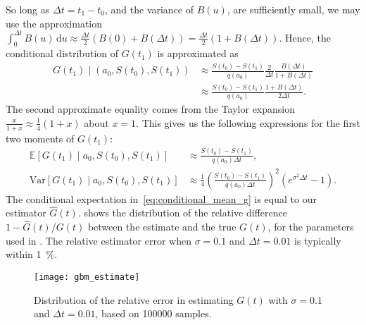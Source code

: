 \documentclass[main.tex]{subfiles}
\begin{document}
So long as $\Delta t=t_1-t_0$, and the variance of $B(u)$, are
sufficiently small, we may use the approximation
$\int_{0}^{\Delta{t}}B(u)\,\mathrm{d}u\approx  \frac{\Delta
  t}{2}(B(0)+B(\Delta t))=\frac{\Delta
  t}{2}(1+B(\Delta t))$.
Hence, the conditional distribution of $G(t_1)$ is approximated as
\begin{align}
  G(t_1)\mid (a_0,S(t_0),S(t_1))
  &\approx
    \frac{S(t_0)-S(t_1)}{q(a_0)}\frac{2}{\Delta t}\frac{B(\Delta t)}{1+B(\Delta t)}\\
  &\approx \frac{S(t_0)-S(t_1)}{q(a_0)}\frac{1+B(\Delta t)}{2\Delta t}.
\end{align}
The second approximate equality comes from the Taylor
expansion $\frac{x}{1+x}\approx \frac{1}{4}(1+x)$ about $x=1$.
This gives us the following expressions for the first two moments
of $G(t_1)$:
\begin{align}\label{eq:conditional_mean_g}
  \mathbb{E}[G(t_1)\mid a_0,S(t_0),S(t_1)]
  &\approx \frac{S(t_0)-S(t_1)}{ q(a_0)\Delta t},\\
  \mbox{Var}[G(t_1)\mid a_0,S(t_0),S(t_1)]
  &\approx \frac{1}{4}{\left(\frac{S(t_0)-S(t_1)}{
    q(a_0)\Delta t}\right)}^2\left( e^{\sigma^2\Delta t} -1 \right).
\end{align}
The conditional expectation in~\eqref{eq:conditional_mean_g} is equal
to our estimator $\hat G(t)$.
 shows the distribution of the relative
difference $1-\hat G(t)/G(t)$ between
the estimate and the true $G(t)$, for
the parameters used in . The relative
estimator error when $\sigma=0.1$ and $\Delta t=0.01$
is typically within \SI{1}{\percent}.
\begin{figure}[htbp]
  \centering
  \texttt{[image: gbm\_estimate]}
  \caption{Distribution of the relative error in estimating $G(t)$ with
    $\sigma=0.1$ and $\Delta t= 0.01$, based on \num{100000} samples.}\label{fig:gbm_estimate}
\end{figure}
\end{document}
